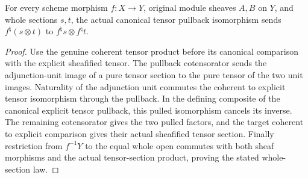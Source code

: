 \begin{theorem}
\label{thm:intrinsic-resume-whole-section-pullback-tensor}
\leanok
{}
For every scheme morphism $f:X\to Y$, original module sheaves $A,B$ on
$Y$, and whole sections $s,t$, the actual canonical tensor pullback
isomorphism sends $f^\natural(s\otimes t)$ to
$f^\natural s\otimes f^\natural t$.
\end{theorem}
\begin{proof}
Use the genuine coherent tensor product before its canonical comparison
with the explicit sheafified tensor. The pullback cotensorator sends the
adjunction-unit image of a pure tensor section to the pure tensor of the
two unit images. Naturality of the adjunction unit commutes the coherent
to explicit tensor isomorphism through the pullback. In the defining
composite of the canonical explicit tensor pullback, this pulled
isomorphism cancels its inverse. The remaining cotensorator gives the
two pulled factors, and the target coherent to explicit comparison gives
their actual sheafified tensor section. Finally restriction from
$f^{-1}Y$ to the equal whole open commutes with both sheaf morphisms and
the actual tensor-section product, proving the stated whole-section law.
\end{proof}

